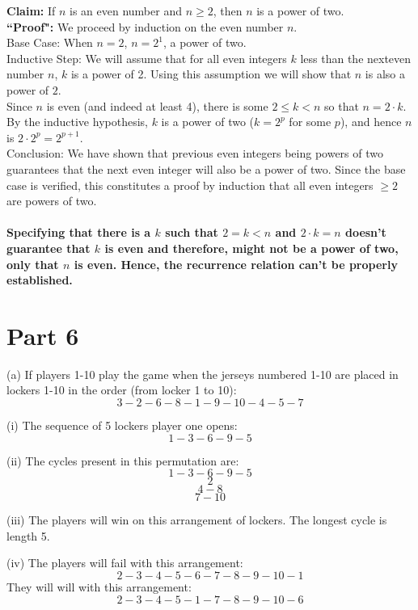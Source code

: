 \documentclass{article}
\begin{document}
{\bf Claim:} If $n$ is an even number and $n\ge 2$, then $n$ is a power of two.\\

{\bf ``Proof":} We proceed by induction on the even number $n$. \\

Base Case: When $n=2$, $n=2^1$, a power of two.\\

Inductive Step: We will assume that for all even integers $k$ less than the nexteven number $n$, $k$ is a power of 2.  Using this assumption we will show that $n$ is also a power of $2$.\\

Since $n$ is even (and indeed at least 4), there is some $2\le k<n$ so that $n=2\cdot k$.  By the inductive hypothesis, $k$ is a power of two ($k=2^p$ for some $p$), and hence $n$ is $2\cdot 2^p=2^{p+1}$.  \\

Conclusion: We have shown that previous even integers being powers of two guarantees that the next even integer will also be a power of two.  Since the base case is verified, this constitutes a proof by induction that all even integers $\ge 2$ are powers of two.\\

\paragraph{Specifying that there is a $k$ such that $2=k<n$ and $2·k=n$ doesn’t guarantee that $k$ is even and therefore, might not be a power of two, only that $n$ is even. Hence, the recurrence relation can’t be properly established.}
\newpage
\section{Part 6}
(a)  If players 1-10 play the game when the jerseys numbered 1-10 are placed in lockers 1-10 in the order (from locker 1 to 10):
$$3-2-6-8-1-9-10-4-5-7$$

(i) The sequence of 5 lockers player one opens:
$$1-3-6-9-5$$

(ii) The cycles present in this permutation are:
$$1-3-6-9-5$$
$$2$$
$$4-8$$
$$7-10$$

(iii) The players will win on this arrangement of lockers. The longest cycle is length 5.

(iv) The players will fail with this arrangement:
$$2-3-4-5-6-7-8-9-10-1$$
They will will with this arrangement:
$$2-3-4-5-1-7-8-9-10-6$$
\end{document}
